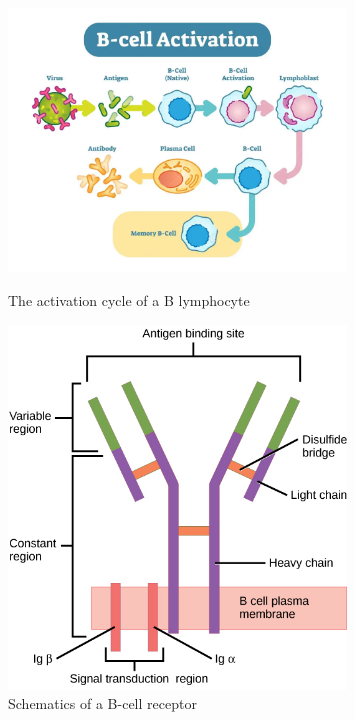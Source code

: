 \begin{figure}[H]
    \begin{minipage}{0.59\textwidth}
        \centering
        \includegraphics[width=0.8\textwidth]{../Images/lymphocyte_b.png}
        \caption{The activation cycle of a B lymphocyte}
        \label{fig:B-cell_activation}
    \end{minipage}\hfill
    \begin{minipage}{0.39\textwidth}
        \centering
        \includegraphics[width=0.8\textwidth]{../Images/B-cell_receptor.jpg}   
        \caption{Schematics of a B-cell receptor}
        \label{fig:B-cell_receptor}
    \end{minipage}
\end{figure}

